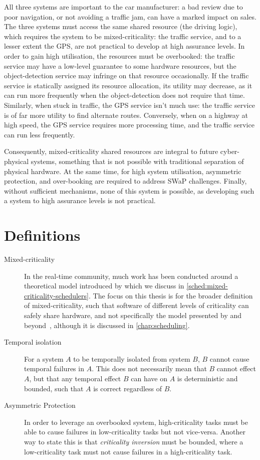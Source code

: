 All three systems are important to the car manufacturer: a bad review due to poor navigation, or not
avoiding a traffic jam, can have a marked impact on sales. The three systems must access the same
shared resource (the driving logic), which requires the system to be mixed-criticality: the traffic
service, and to a lesser extent the GPS, are not practical to develop at high assurance levels. 
In order to gain high utilisation, the resources must be overbooked: the traffic service may have a
low-level guarantee to some hardware resources, but the object-detection service may infringe
on that resource occasionally. If the traffic service is statically assigned its resource
allocation, its utility may decrease, as it can run more frequently when the object-detection does not
require that time. Similarly, when stuck in traffic, the GPS service isn't much use: the traffic
service is of far more utility to find alternate routes. Conversely, when on a highway at high speed, the GPS
service requires more processing time, and the traffic service can run less frequently. 

Consequently, mixed-criticality shared resources are integral to future cyber-physical
systems, something that is not possible with traditional separation
of physical hardware. At the same time, for high system utilisation, 
asymmetric protection, and over-booking are required to address SWaP challenges. Finally, without
sufficient mechanisms, none of this system is possible, as developing such a system to high
assurance levels is not practical.

\section{Definitions}

\begin{description}
    \item[Mixed-criticality] In the real-time community, much work has been
conducted around a theoretical model introduced by \citet{Vestal_07} which we discuss in
\cref{sched:mixed-criticality-schedulers}.
The focus on this thesis is for the broader definition of mixed-criticality, such that software of
different levels of criticality can safely share hardware, and not specifically the model
presented by \citet{Vestal_07} and beyond~\citep{Burns_Davis_17}, although it is discussed in
\cref{chap:scheduling}.
\item[Temporal isolation] For a system $A$ to be temporally isolated from system $B$, $B$ cannot
        cause temporal failures in $A$. This does not necessarily mean that $B$ cannot effect $A$,
        but that any temporal effect $B$ can have on $A$ is deterministic and bounded, such that $A$
        is correct regardless of $B$. 
\item[Asymmetric Protection] In order to leverage an overbooked system, high-criticality tasks
        must be able to cause failures in low-criticality tasks but not vice-versa. Another way to
        state this is that \emph{criticality inversion} must be bounded, where a low-criticality
        task must not cause failures in a high-criticality task.
\end{description}


